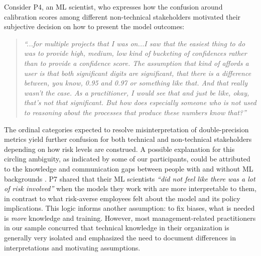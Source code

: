 
Consider P4, an ML scientist, who expresses how the confusion around calibration scores \cite{pleiss2017fairness} among different non-technical stakeholders motivated their subjective decision on how to present the model outcomes:

\begin{quote}
    \textit{``...for multiple projects that I was on...I saw that the easiest thing to do was to provide high, medium, low kind of bucketing of confidences rather than to provide a confidence score. The assumption that kind of affords a user is that both significant digits are significant, that there is a difference between, you know, 0.95 and 0.97 or something like that. And that really wasn't the case. As a practitioner, I would see that and just be like, okay, that's not that significant. But how does especially someone who is not used to reasoning about the processes that produce these numbers know that?''
}
\end{quote}

The ordinal categories expected to resolve misinterpretation of double-precision metrics yield further confusion for both technical and non-technical stakeholders depending on how risk levels are construed. A possible explanation for this circling ambiguity, as indicated by some of our participants, could be attributed to the knowledge and communication gaps between people with and without ML backgrounds \cite{chen2021beyond,kommiya2024towards,varanasi2023currently}. P7 shared that their ML scientists \textit{``did not feel like there was a lot of risk involved''} when the models they work with are more interpretable to them, in contrast to what risk-averse employees felt about the model and its policy implications. This logic informs another assumption: to fix biases, what is needed is \textit{more} knowledge and training. However, most management-related practitioners in our sample concurred that technical knowledge in their organization is generally very isolated and emphasized the need to document differences in interpretations and motivating assumptions.


